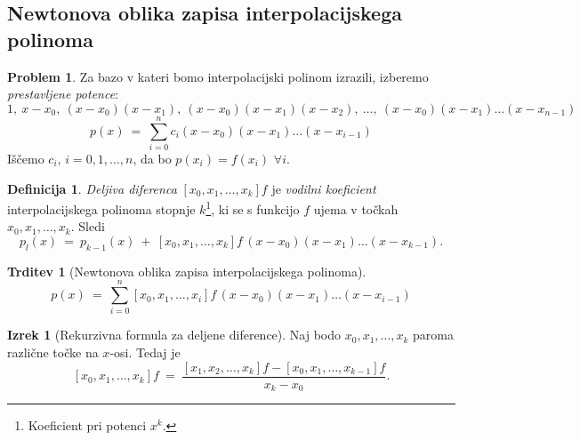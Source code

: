\documentclass[11pt]{article}
\theoremstyle{definition}
\newtheorem{definicija}{Definicija}[section]
\theoremstyle{definition}
\newtheorem{problem}{Problem}[section]
\newtheorem{trditev}{Trditev}[section]
\newtheorem{izrek}{Izrek}[section]
\begin{document}

\subsection{Newtonova oblika zapisa interpolacijskega polinoma}
\vspace{0.5cm}

\begin{problem}

Za bazo v kateri bomo interpolacijski polinom izrazili, izberemo \textit{prestavljene potence}:
$$1, ~x-x_0, ~(x-x_0)(x-x_1), ~(x-x_0)(x-x_1)(x-x_2), ~\ldots, ~(x-x_0)(x-x_1)\ldots(x-x_{n-1})$$
$$p(x) ~=~ \sum_{i=0}^n c_i (x-x_0)(x-x_1)\ldots(x-x_{i-1})$$
Iščemo $c_i$, $i = 0, 1, \ldots, n$, da bo $p(x_i) = f(x_i)$ $\forall i$.

\end{problem}
\vspace{0.5cm}

\begin{definicija}

\textit{Deljiva diferenca} $[x_0, x_1, \ldots, x_k]f$ je \textit{vodilni koeficient} interpolacijskega polinoma stopnje $k$\footnote{Koeficient pri potenci $x^k$.}, ki se s funkcijo $f$ ujema v točkah $x_0, x_1, \ldots, x_k$. Sledi
$$p_l(x) ~=~ p_{k-1}(x) ~+~ [x_0, x_1, \ldots, x_k]f \,(x-x_0)(x-x_1)\ldots(x-x_{k-1}).$$

\end{definicija}
\vspace{0.5cm}

\begin{trditev}[Newtonova oblika zapisa interpolacijskega polinoma]

$$p(x) ~=~ \sum_{i=0}^n [x_0, x_1, \ldots, x_i]f \,(x-x_0)(x-x_1)\ldots(x-x_{i-1})$$

\end{trditev}
\vspace{0.5cm}

\begin{izrek}[Rekurzivna formula za deljene diference]

Naj bodo $x_0, x_1, \ldots, x_k$ paroma različne točke na $x$-osi. Tedaj je
$$[x_0, x_1, \ldots, x_k]f ~=~ \frac{[x_1, x_2, \ldots, x_k]f - [x_0, x_1, \ldots, x_{k-1}]f}{x_k - x_0}.$$

\end{izrek}
\vspace{0.5cm}
\end{document}
